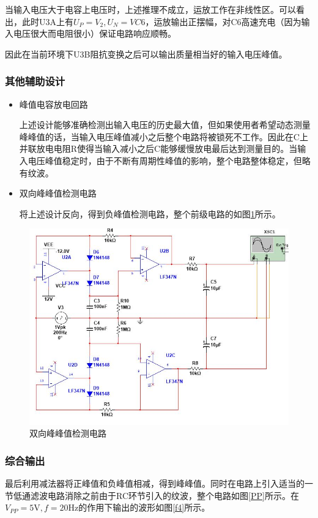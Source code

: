 \documentclass[UTF8,a4paper]{paper}
\begin{document}
当输入电压大于电容上电压时，上述推理不成立，运放工作在非线性区。可以看出，此时U3A上有$U_P=V_2,U_N=V{C6}$，运放输出正摆幅，对C6高速充电（因为输入电压很大而电阻很小）保证电路响应顺畅。

因此在当前环境下U3B阻抗变换之后可以输出质量相当好的输入电压峰值。

\subsubsection{其他辅助设计}
\begin{itemize}
\item 峰值电容放电回路

上述设计能够准确检测出输入电压的历史最大值，但如果使用者希望动态测量峰峰值的话，当输入电压峰值减小之后整个电路将被锁死不工作。因此在C上并联放电电阻R使得当输入减小之后C能够缓慢放电最后达到测量目的。当输入电压峰值稳定时，由于不断有周期性峰值的影响，整个电路整体稳定，但略有纹波。

\item 双向峰峰值检测电路

将上述设计反向，得到负峰值检测电路，整个前级电路的如图\ref{f3}所示。

\end{itemize}

\begin{figure}[h]
\centering
\includegraphics[width=\textwidth]{f3.jpg}
\caption{双向峰峰值检测电路}
\label{f3}
\end{figure}

\subsubsection{综合输出}
最后利用减法器将正峰值和负峰值相减，得到峰峰值。同时在电路上引入适当的一节低通滤波电路消除之前由于RC环节引入的纹波，整个电路如图\ref{PP}所示。在$V_{PP}=5\mathrm{V},f=20\mathrm{Hz}$的作用下输出的波形如图\ref{f4}所示。
\end{document}
